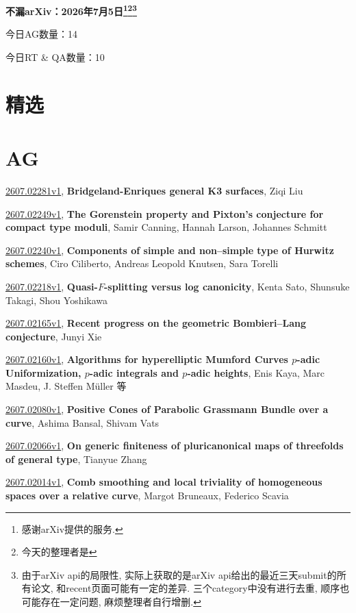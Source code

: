 \documentclass[9pt, a4paper]{article}
\theoremstyle{plain}
\theoremstyle{definition}
\theoremstyle{remark}
\newcommand{\arxiv}[3]{\href{https://arxiv.org/abs/#1}{#1}, \textbf{\textcolor{arxivblue}{#2}}, #3}
\newcommand{\AGnumber}{14}
\newcommand{\RTQAnumber}{10}
\newcommand{\NewestDate}{2026年7月5日}
\newcommand{\todayarXiver}{} %
\begin{document}
\begin{center}
    \Huge\textbf{不漏arXiv：\NewestDate\footnote{感谢arXiv提供的服务.}\footnote{今天的整理者是\todayarXiver}\footnote{由于arXiv api的局限性, 实际上获取的是arXiv api给出的最近三天submit的所有论文, 和recent页面可能有一定的差异. 三个category中没有进行去重, 顺序也可能存在一定问题, 麻烦整理者自行增删.}} \\
\end{center}

\setcounter{section}{-1}

\begin{center}
    今日AG数量：\AGnumber
    
    今日RT \& QA数量：\RTQAnumber
    
\end{center}


\section{精选}


\section{AG}
\arxiv{2607.02281v1}{Bridgeland-Enriques general K3 surfaces}{Ziqi Liu}

\arxiv{2607.02249v1}{The Gorenstein property and Pixton's conjecture for compact type moduli}{Samir Canning, Hannah Larson, Johannes Schmitt}

\arxiv{2607.02240v1}{Components of simple and non--simple type of Hurwitz schemes}{Ciro Ciliberto, Andreas Leopold Knutsen, Sara Torelli}

\arxiv{2607.02218v1}{Quasi-$F$-splitting versus log canonicity}{Kenta Sato, Shunsuke Takagi, Shou Yoshikawa}

\arxiv{2607.02165v1}{Recent progress on the geometric Bombieri--Lang conjecture}{Junyi Xie}

\arxiv{2607.02160v1}{Algorithms for hyperelliptic Mumford Curves $p$-adic Uniformization, $p$-adic integrals and $p$-adic heights}{Enis Kaya, Marc Masdeu, J. Steffen Müller 等}

\arxiv{2607.02080v1}{Positive Cones of Parabolic Grassmann Bundle over a curve}{Ashima Bansal, Shivam Vats}

\arxiv{2607.02066v1}{On generic finiteness of pluricanonical maps of threefolds of general type}{Tianyue Zhang}

\arxiv{2607.02014v1}{Comb smoothing and local triviality of homogeneous spaces over a relative curve}{Margot Bruneaux, Federico Scavia}
\end{document}
